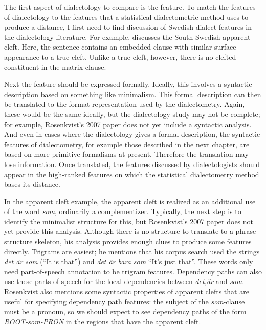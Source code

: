 The first aspect of dialectology to compare is the feature. To match the
features of dialectology to the features that a statistical
dialectometric method uses to produce a distance, I first need to find
discussion of Swedish dialect features in the dialectology
literature. For example,  discusses the South
Swedish apparent cleft. Here, the sentence contains an embedded clause
with similar surface appearance to a true cleft. Unlike a true cleft,
however, there is no clefted constituent in the matrix clause.


Next the feature should be expressed formally. Ideally, this involves
a syntactic description based on something like minimalism. This
formal description can then be translated to the format representation
used by the dialectometry. Again, these would be the same ideally, but
the dialectology study may not be complete; for example, Rosenkvist's
2007 paper does not yet include a syntactic analysis. And even in
cases where the dialectology gives a formal description, the syntactic
features of dialectometry, for example those described in the next
chapter, are based on more primitive formalisms at present. Therefore
the translation may lose information. Once translated, the features
discussed by dialectologists should appear in the high-ranked features
on which the statistical dialectometry method bases its distance.

In the apparent cleft example, the apparent cleft is realized as an
additional use of the word {\it som}, ordinarily a
complementizer. Typically, the next step is to identify the minimalist
structure for this, but Rosenkvist's 2007 paper does not yet provide
this analysis. Although there is no structure to translate to a
phrase-structure skeleton, his analysis provides enough clues to
produce some features directly. Trigrams are easiest; he mentions that
his corpus search used the strings {\it det \"ar som} (``It is that'')
and {\it det \"ar bara som} ``It's just that''. These words only need
part-of-speech annotation to be trigram features. Dependency
paths can also use these parts of speech for the local dependencies
between {\it det,\"ar} and {\it som}. Rosenkvist also mentions
some syntactic properties of apparent clefts that are useful for
specifying dependency path features: the subject of the {\it
  som}-clause must be a pronoun, so we should expect to see
dependency paths of the form {\it ROOT-som-PRON} in the regions that
have the apparent cleft.

